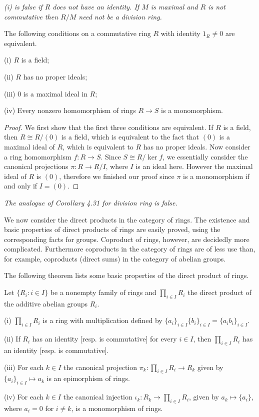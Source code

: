 \begin{note}\em
(i) is false if $R$ does not have an identity. If $M$ is maximal and $R$ is not commutative then $R/M$ need not be a division ring.
\end{note}
\begin{corollary}
The following conditions on a commutative ring $R$ with identity $1_R\ne 0$ are equivalent.\par
(i) $R$ is a field;\par
(ii) $R$ has no proper ideals;\par
(iii) $0$ is a maximal ideal in $R$;\par
(iv) Every nonzero homomorphism of rings $R\to S$ is a monomorphism.
\end{corollary}
\begin{proof}
We first show that the first three conditions are equivalent. If $R$ is a field, then $R\cong R/(0)$ is a field, which is equivalent to the fact that $(0)$ is a maximal ideal of $R$, which is equivalent to $R$ has no proper ideals. Now consider a ring homomorphism $f:R\to S$. Since $S\cong R/\ker f$, we essentially consider the canonical projections $\pi:R\to R/I$, where $I$ is an ideal here. However the maximal ideal of $R$ is $(0)$, therefore we finished our proof since $\pi$ is a monomorphism if and only if $I=(0)$.
\end{proof}
\begin{note}\em
The analogue of Corollary 4.31 for division ring is false.
\end{note}
We now consider the direct products in the category of rings. The existence and basic properties of direct products of rings are easily proved, using the corresponding facts for groups. Coproduct of rings, however, are decidedly more complicated. Furthermore coproducts in the category of rings are of less use than, for example, coproducts (direct sums) in the category of abelian groups.\par
The following theorem lists some basic properties of the direct product of rings.
\begin{theorem}
Let $\{R_i:i\in I\}$ be a nonempty family of rings and $\prod_{i\in I}R_i$ the direct product of the additive abelian groups $R_i$.\par
(i) $\prod_{i\in I}R_i$ is a ring with multiplication defined by $\{a_i\}_{i\in I}\{b_i\}_{i\in I}=\{a_ib_i\}_{i\in I}$.\par
(ii) If $R_i$ has an identity [resp. is commutative] for every $i\in I$, then $\prod_{i\in I}R_i$ has an identity [resp. is commutative].\par
(iii) For each $k\in I$ the canonical projection $\pi_k:\prod_{i\in I}R_i\to R_k$ given by $\{a_i\}_{i\in I}\mapsto a_k$ is an epimorphism of rings.\par
(iv) For each $k\in I$ the canonical injection $\iota_k:R_k\to\prod_{i\in I}R_i$, given by $a_k\mapsto\{a_i\}$, where $a_i=0$ for $i\ne k$, is a monomorphism of rings.
\end{theorem}
